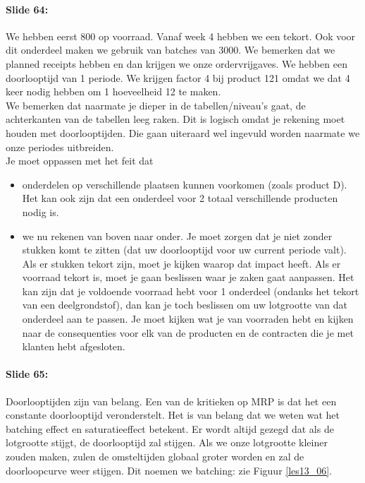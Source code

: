 \documentclass[10pt,a4paper]{report}
\begin{document}
\paragraph{Slide 64:} We hebben eerst 800 op voorraad. Vanaf week 4 hebben we een tekort. Ook voor dit onderdeel maken we gebruik van batches van 3000. We bemerken dat we planned receipts hebben en dan krijgen we onze ordervrijgaves. We hebben een doorlooptijd van 1 periode. We krijgen factor 4 bij product 121 omdat we dat 4 keer nodig hebben om 1 hoeveelheid 12 te maken.\\
We bemerken dat naarmate je dieper in de tabellen/niveau's gaat, de achterkanten van de tabellen leeg raken. Dit is logisch omdat je rekening moet houden met doorlooptijden. Die gaan uiteraard wel ingevuld worden naarmate we onze periodes uitbreiden.\\
Je moet oppassen met het feit dat
\begin{itemize}
\item onderdelen op verschillende plaatsen kunnen voorkomen (zoals product D). Het kan ook zijn dat een onderdeel voor 2 totaal verschillende producten nodig is. 
\item we nu rekenen van boven naar onder. Je moet zorgen dat je niet zonder stukken komt te zitten (dat uw doorlooptijd voor uw current periode valt). Als er stukken tekort zijn, moet je kijken waarop dat impact heeft. Als er voorraad tekort is, moet je gaan beslissen waar je zaken gaat aanpassen. Het kan zijn dat je voldoende voorraad hebt voor 1 onderdeel (ondanks het tekort van een deelgrondstof), dan kan je toch beslissen om uw lotgrootte van dat onderdeel aan te passen. Je moet kijken wat je van voorraden hebt en kijken naar de consequenties voor elk van de producten en de contracten die je met klanten hebt afgesloten. 
\end{itemize}

\paragraph{Slide 65:} Doorlooptijden zijn van belang. Een van de kritieken op MRP is dat het een constante doorlooptijd veronderstelt. Het is van belang dat we weten wat het batching effect en saturatieeffect betekent. Er wordt altijd gezegd dat als  de lotgrootte stijgt,  de doorlooptijd zal stijgen. Als we onze lotgrootte kleiner zouden maken, zulen de omsteltijden globaal groter worden en zal de doorloopcurve weer stijgen. Dit noemen we batching: zie Figuur \ref{les13_06}.
\end{document}
